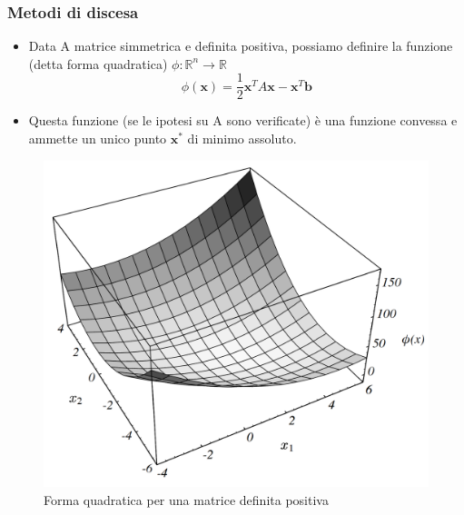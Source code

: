 \documentclass[10pt]{beamer}
\begin{document}
\begin{frame} \frametitle{Metodi di discesa}
\begin{itemize}
    \item Data A matrice simmetrica e definita positiva, possiamo definire la funzione (detta \alert{forma quadratica}) $\phi:\mathbb{R}^n \to \mathbb{R}$ $$\phi(\mathbf{x})=\frac{1}{2}\mathbf{x}^TA\mathbf{x}-\mathbf{x}^T\mathbf{b}$$
    \item Questa funzione (se le ipotesi su A sono verificate) è una funzione convessa e ammette un unico punto $\mathbf{x}^{\ast}$ di \alert{minimo assoluto}.
    
\end{itemize}
\begin{figure}
    \centering
    \includegraphics[width=.25\linewidth]{cg_quad.png}
    \caption{Forma quadratica per una matrice definita positiva}
    \label{fig:quad}
\end{figure}
\end{frame}
\end{document}
